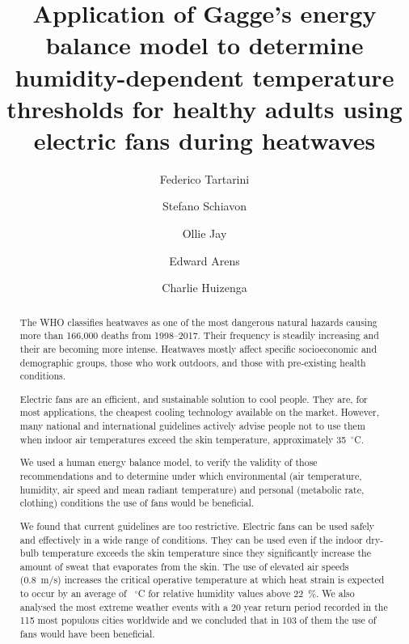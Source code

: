
\begin{frontmatter}

\title{Application of Gagge's energy balance model to determine humidity-dependent temperature thresholds for healthy adults using electric fans during heatwaves}

\author[sinBerBest]{Federico Tartarini}
\author[CBE]{Stefano Schiavon}
\author[USYD]{Ollie Jay}
\author[CBE]{Edward Arens}
\author[CBE]{Charlie Huizenga}

\address[sinBerBest]{SinBerBEST, Berkeley Education Alliance for Research in Singapore, Singapore}
\address[CBE]{Center for the Built Environment, University of California, Berkeley, USA}
 \address[USYD]{Sydney School of Health Sciences, Faculty of Medicine and Health, The University of Sydney, Sydney, Australia}

\begin{abstract}
    The WHO classifies heatwaves as one of the most dangerous natural hazards causing more than 166,000 deaths from 1998--2017.
    Their frequency is steadily increasing and their are becoming more intense.
    Heatwaves mostly affect specific socioeconomic and demographic groups, those who work outdoors, and those with pre-existing health conditions.
    
    Electric fans are an efficient, and sustainable solution to cool people.
    They are, for most applications, the cheapest cooling technology available on the market.
    However, many national and international guidelines actively advise people not to use them when indoor air temperatures exceed the skin temperature, approximately 35~$^{\circ}$C\@.
    
    We used a human energy balance model, to verify the validity of those recommendations and to determine under which environmental (air temperature, humidity, air speed and mean radiant temperature) and personal (metabolic rate, clothing) conditions the use of fans would be beneficial.
    
    We found that current guidelines are too restrictive.
    Electric fans can be used safely and effectively in a wide range of conditions.
    They can be used even if the indoor dry-bulb temperature exceeds the skin temperature since they significantly increase the amount of sweat that evaporates from the skin.
    The use of elevated air speeds (0.8~m/s) increases the critical operative temperature at which heat strain is expected to occur by an average of ~$^{\circ}$C for relative humidity values above 22~\%\@.
    We also analysed the most extreme weather events with a 20 year return period recorded in the 115 most populous cities worldwide and we concluded that in 103 of them the use of fans would have been beneficial.
    

\end{abstract}
\end{frontmatter}
